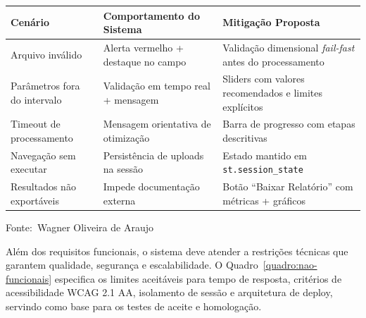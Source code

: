 \documentclass[12pt,a4paper]{article}
\newcommand{\oautor}{Wagner Oliveira de Araujo}
\begin{document}
\begin{quadro}[ht]
\centering
\small
\caption{Tratamento de exceções e usabilidade}
\label{quadro:excecoes}
\begin{threeparttable}
\begin{tabularx}{\textwidth}{|l|X|X|} \hline
\textbf{Cenário} & \textbf{Comportamento do Sistema} & \textbf{Mitigação Proposta} \\ \hline
Arquivo inválido & Alerta vermelho + destaque no campo & Validação dimensional \textit{fail-fast} antes do processamento \\ \hline
Parâmetros fora do intervalo & Validação em tempo real + mensagem & Sliders com valores recomendados e limites explícitos \\ \hline
Timeout de processamento & Mensagem orientativa de otimização & Barra de progresso com etapas descritivas \\ \hline
Navegação sem executar & Persistência de uploads na sessão & Estado mantido em \texttt{st.session\_state} \\ \hline
Resultados não exportáveis & Impede documentação externa & Botão ``Baixar Relatório'' com métricas + gráficos \\ \hline
\end{tabularx}
\begin{tablenotes}[flushleft]
\footnotesize
\item Fonte:~\oautor
\end{tablenotes}
\end{threeparttable}
\end{quadro}

Além dos requisitos funcionais, o sistema deve atender a restrições técnicas que garantem qualidade, segurança e escalabilidade. O Quadro~\ref{quadro:nao-funcionais} especifica os limites aceitáveis para tempo de resposta, critérios de acessibilidade WCAG 2.1 AA, isolamento de sessão e arquitetura de deploy, servindo como base para os testes de aceite e homologação.
\end{document}
